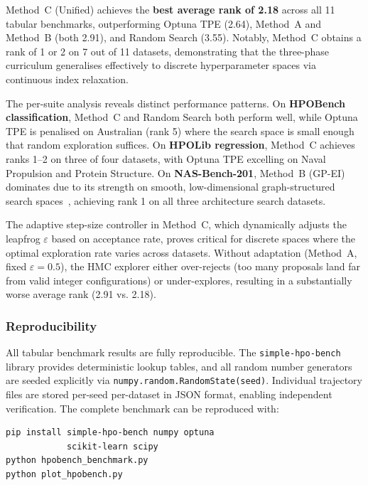 \documentclass[12pt,a4paper]{article}
\begin{document}
Method~C (Unified) achieves the \textbf{best average rank of 2.18}
across all 11 tabular benchmarks, outperforming Optuna TPE (2.64),
Method~A and Method~B (both 2.91), and Random Search (3.55).
Notably, Method~C obtains a rank of 1 or 2 on 7 out of 11 datasets,
demonstrating that the three-phase curriculum generalises effectively
to discrete hyperparameter spaces via continuous index relaxation.

The per-suite analysis reveals distinct performance patterns.
On \textbf{HPOBench classification}, Method~C and Random Search both
perform well, while Optuna TPE is penalised on Australian (rank 5)
where the search space is small enough that random exploration
suffices.  On \textbf{HPOLib regression}, Method~C achieves ranks
1--2 on three of four datasets, with Optuna TPE excelling on
Naval Propulsion and Protein Structure.  On \textbf{NAS-Bench-201},
Method~B (GP-EI) dominates due to its strength on smooth,
low-dimensional graph-structured search spaces~\cite{dong2020nasbench201},
achieving rank 1 on all three architecture search datasets.

The adaptive step-size controller in Method~C, which dynamically adjusts
the leapfrog $\varepsilon$ based on acceptance rate, proves
critical for discrete spaces where the optimal exploration rate varies
across datasets.  Without adaptation (Method~A, fixed $\varepsilon = 0.5$),
the HMC explorer either over-rejects (too many proposals land far from
valid integer configurations) or under-explores, resulting in a
substantially worse average rank (2.91 vs. 2.18).

\subsubsection{Reproducibility}

All tabular benchmark results are fully reproducible.  The
\texttt{simple-hpo-bench}~\cite{klein2019tabular} library provides
deterministic lookup tables, and all random number generators are
seeded explicitly via \texttt{numpy.random.RandomState(seed)}.
Individual trajectory files are stored per-seed per-dataset in
JSON format, enabling independent verification.  The complete benchmark
can be reproduced with:
\begin{verbatim}
pip install simple-hpo-bench numpy optuna
            scikit-learn scipy
python hpobench_benchmark.py
python plot_hpobench.py
\end{verbatim}
\end{document}
